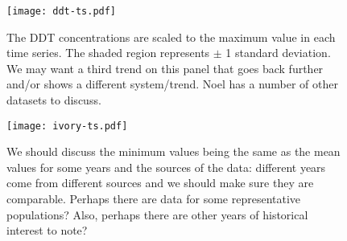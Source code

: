 \documentclass[12pt]{article}
\begin{document}
\begin{figure}[htbp]
	\centering
		\texttt{[image: ddt-ts.pdf]}
	\caption{The DDT concentrations are scaled to the maximum value in each time series. The shaded region represents $\pm$ 1 standard deviation. We may want a third trend on this panel that goes back further and/or shows a different system/trend. Noel has a number of other datasets to discuss.}
	\label{fig:ddt-ts}
\end{figure}

\begin{figure}[htbp]
	\centering
		\texttt{[image: ivory-ts.pdf]}
	\caption{We should discuss the minimum values being the same as the mean values for some years and the sources of the data: different years come from different sources and we should make sure they are comparable. Perhaps there are data for some representative populations? Also, perhaps there are other years of historical interest to note?}
	\label{fig:ivory-ts}
\end{figure}





%
\end{document}
